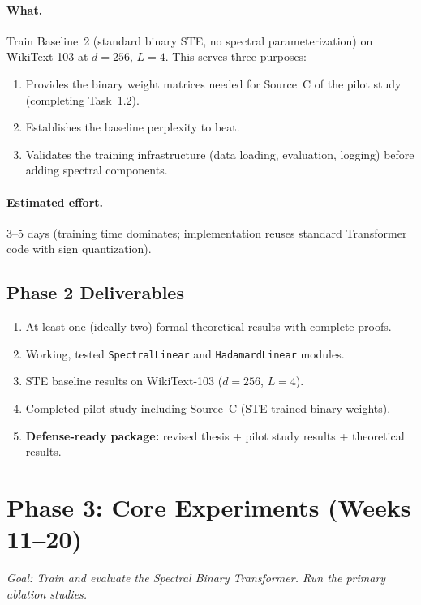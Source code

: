 \documentclass[12pt,a4paper]{article}
\begin{document}
\paragraph{What.} Train Baseline~2 (standard binary STE, no spectral parameterization) on WikiText-103 at $d = 256$, $L = 4$. This serves three purposes:
\begin{enumerate}
    \item Provides the binary weight matrices needed for Source~C of the pilot study (completing Task~1.2).
    \item Establishes the baseline perplexity to beat.
    \item Validates the training infrastructure (data loading, evaluation, logging) before adding spectral components.
\end{enumerate}

\paragraph{Estimated effort.} 3--5 days (training time dominates; implementation reuses standard Transformer code with sign quantization).


\subsection{Phase 2 Deliverables}

\begin{enumerate}
    \item At least one (ideally two) formal theoretical results with complete proofs.
    \item Working, tested \texttt{SpectralLinear} and \texttt{HadamardLinear} modules.
    \item STE baseline results on WikiText-103 ($d = 256$, $L = 4$).
    \item Completed pilot study including Source~C (STE-trained binary weights).
    \item \textbf{Defense-ready package:} revised thesis + pilot study results + theoretical results.
\end{enumerate}


\section{Phase 3: Core Experiments (Weeks 11--20)}\label{sec:phase3}

\textit{Goal: Train and evaluate the Spectral Binary Transformer. Run the primary ablation studies.}
\end{document}
